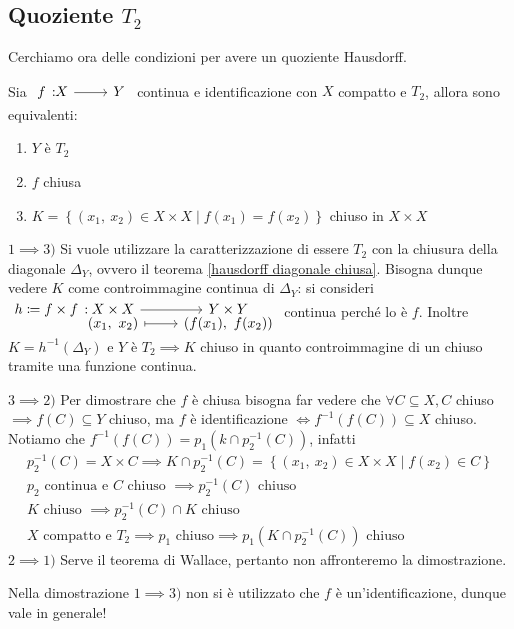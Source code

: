	\subsection{Quoziente $T_2$}
Cerchiamo ora delle condizioni per avere un quoziente Hausdorff.
\begin{theorema} \label{quoziente Hausdorff}
	Sia $\funz f X Y$ continua e identificazione con $X$ compatto e $T_2$, allora sono equivalenti:
		\begin{enumerate}
			\item $Y$ è $T_2$
			\item $f$ chiusa
			\item $K=\left\{ (x_1,\ x_2)\in X\times X \mid f(x_1)=f(x_2) \right\}$ chiuso in $X\times X$
		\end{enumerate}
\end{theorema}
\begin{demonstration}
	$1 \implies 3)$  Si vuole utilizzare la caratterizzazione di essere $T_2$ con la chiusura della diagonale $\Delta_Y$, ovvero il teorema \ref{hausdorff diagonale chiusa}. Bisogna dunque vedere $K$ come controimmagine continua di $\Delta_Y$: si consideri	 $\funztot {h\coloneqq f\times f} {X\times X} {Y\times Y} {(x_1,\ x_2)} {\left( f(x_1), \ f(x_2) \right) }$ continua perché lo è $f$. Inoltre $K=h^{-1}(\Delta_Y)$ e $Y$ è $T_2 \implies K$ chiuso in quanto controimmagine di un chiuso tramite una funzione continua.
	$3\implies 2)$ Per dimostrare che $f$ è chiusa bisogna far vedere che $\forall C\subseteq X, C$ chiuso $\implies f(C)\subseteq Y$ chiuso, ma $f$ è identificazione $\iff f^{-1}\left( f(C) \right)\subseteq X$ chiuso. Notiamo che $f^{-1}\left( f(C) \right)= p_1(k\cap p_2^{-1}(C))$, infatti 
		\begin{gather*}
			p_2^{-1}(C)=X\times C \implies K\cap p_2^{-1}(C)= \left\{ (x_1,\ x_2)\in X\times X \mid f(x_2)\in C \right\}\\
			p_2 \text{ continua e $C$ chiuso } \implies p_2^{-1}(C) \text{ chiuso} \\
			K \text{ chiuso }\implies p_2^{-1}(C)\cap K \text{ chiuso}\\
			X \text{ compatto e } T_2 \implies p_1 \text{ chiuso}\implies p_1 \left( K\cap p_2^{-1}(C) \right) \text{ chiuso}
		\end{gather*}
	$2\implies 1)$ Serve il teorema di Wallace, pertanto non affronteremo la dimostrazione.
\end{demonstration}
\begin{observe}
	Nella dimostrazione $1\implies 3)$ non si è utilizzato che $f$ è un'identificazione, dunque vale in generale!
\end{observe}